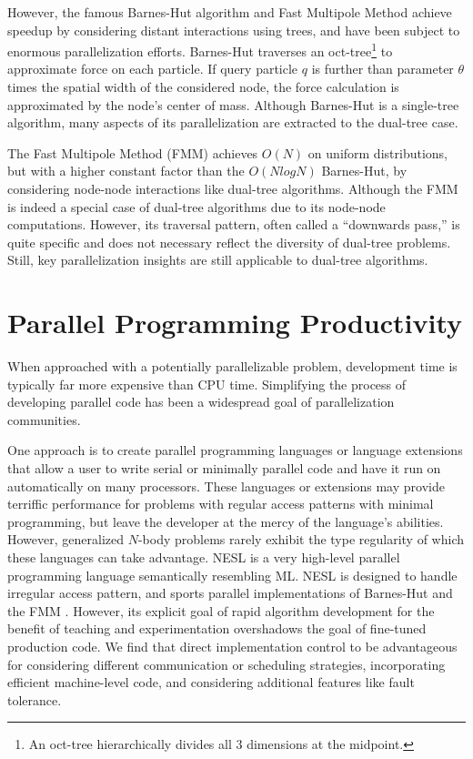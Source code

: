 \documentclass[twoside,leqno,twocolumn]{article}
\begin{document}
However, the famous Barnes-Hut algorithm\cite{barnes_hut} and Fast Multipole Method\cite{greengard_fmm} achieve speedup by considering distant interactions using trees, and have been subject to enormous parallelization efforts.
Barnes-Hut\cite{barnes_hut} traverses an oct-tree\footnote{An oct-tree hierarchically divides all 3 dimensions at the midpoint.} to approximate force on each particle.
If query particle $q$ is further than parameter $\theta$ times the spatial width of the considered node, the force calculation is approximated by the node's center of mass.
Although Barnes-Hut is a single-tree algorithm, many aspects of its parallelization are extracted to the dual-tree case.

The Fast Multipole Method (FMM)\cite{greengard_fmm} achieves $O(N)$ on uniform distributions, but with a higher constant factor than the $O(N log N)$ Barnes-Hut, by considering node-node interactions like dual-tree algorithms.
Although the FMM is indeed a special case of dual-tree algorithms due to its node-node computations.
However, its traversal pattern, often called a ``downwards pass,'' is quite specific and does not necessary reflect the diversity of dual-tree problems.
Still, key parallelization insights are still applicable to dual-tree algorithms.


\section{Parallel Programming Productivity}

When approached with a potentially parallelizable problem, development time is typically far more expensive than CPU time.
Simplifying the process of developing parallel code has been a widespread goal of parallelization communities.

One approach is to create parallel programming languages or language extensions that allow a user to write serial or minimally parallel code and have it run on automatically on many processors.
These languages or extensions may provide terriffic performance for problems with regular access patterns with minimal programming, but leave the developer at the mercy of the language's abilities.
However, generalized $N$-body problems rarely exhibit the type regularity of which these languages can take advantage.
NESL is a very high-level parallel programming language semantically resembling ML.
NESL is designed to handle irregular access pattern, and sports parallel implementations of Barnes-Hut and the FMM \cite{blelloch_nbody}.
However, its explicit goal of rapid algorithm development for the benefit of teaching and experimentation overshadows the goal of fine-tuned production code.
We find that direct implementation control to be advantageous for considering different communication or scheduling strategies, incorporating efficient machine-level code, and considering additional features like fault tolerance.
\end{document}
